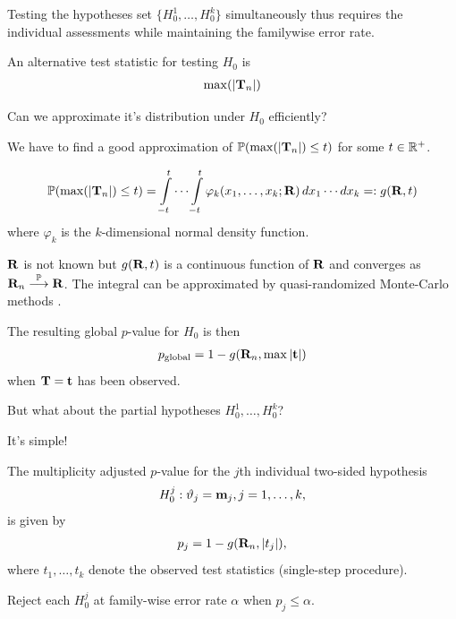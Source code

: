 \documentclass[landscape]{slides}
\begin{document}
Testing the hypotheses set $\{H_0^1, \ldots, H_0^k\}$ simultaneously thus requires the individual
assessments while maintaining the familywise error rate.


An alternative test statistic for testing $H_0$ is
\begin{eqnarray*}
\max(|\mathbf{T}_n|)
\end{eqnarray*}

Can we approximate it's distribution under $H_0$ efficiently?

We have to find a good approximation of $\mathbb{P}(\max(|\mathbf{T}_n|) \le t)$
for some $t \in \mathbb{R}^+$.


\begin{eqnarray*}
\mathbb{P}(\max(|\mathbf{T}_n|) \le t) = \int\limits_{-t}^t \cdots \int\limits_{-t}^t
\varphi_k(x_1, \dots, x_k; \mathbf{R}) \, dx_1 \cdots dx_k =: g(\mathbf{R}, t) 
\end{eqnarray*}
where $\varphi_k$ is the $k$-dimensional normal density function.

$\mathbf{R}$ is not known but $g(\mathbf{R}, t)$ is a continuous function of $\mathbf{R}$ 
and converges as $\mathbf{R}_n \stackrel{\mathbb{P}}{\longrightarrow} \mathbf{R}$. The integral can be approximated
by quasi-randomized Monte-Carlo methods \citep{Genz1992,GenzBretz1999}.

The resulting global $p$-value 
for $H_0$ is then 
\begin{eqnarray*}
p_\text{global} = 1 - g(\mathbf{R}_n, \max|\mathbf{t}|)
\end{eqnarray*}
when $\mathbf{T} = \mathbf{t}$ has been observed.


But what about the partial hypotheses $H_0^1, \ldots, H_0^k$?

It's simple!

The multiplicity adjusted $p$-value for the $j$th
individual two-sided hypothesis 
\begin{eqnarray*}
H_0^j: \vartheta_j = \mathbf{m}_j, j = 1, \dots, k,
\end{eqnarray*}
is given by 
\begin{eqnarray*}
p_j = 1 - g(\mathbf{R}_n, |t_j|),
\end{eqnarray*}
where $t_1, \dots, t_k$ denote the observed test statistics (single-step procedure).

Reject each $H_0^j$ at family-wise error rate $\alpha$ when $p_j \leq \alpha$.

\end{document}
